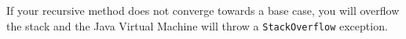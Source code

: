 If your recursive method does not converge towards a base case, you
will overflow the stack and the Java Virtual Machine will throw a
\verb+StackOverflow+ exception. 






